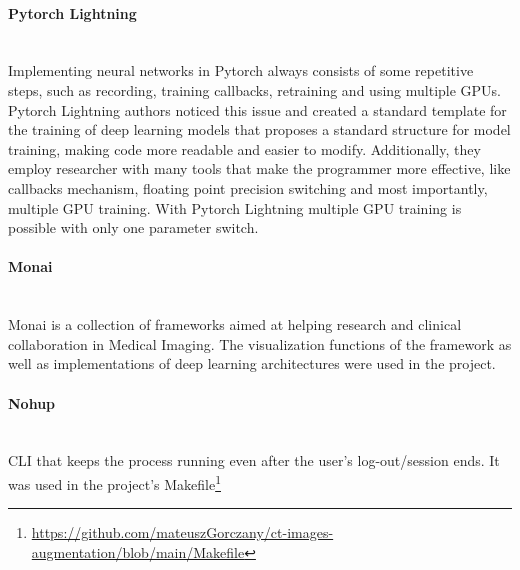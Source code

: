 \paragraph{Pytorch Lightning}\mbox{}\\
\indent Implementing neural networks in Pytorch always consists of some repetitive steps, such as recording, training callbacks, retraining and using multiple GPUs. Pytorch Lightning\cite{Falcon_PyTorch_Lightning_2019} authors noticed this issue and created a standard template for the training of deep learning models that proposes a standard structure for model training, making code more readable and easier to modify. Additionally, they employ researcher with many tools that make the programmer more effective, like callbacks mechanism, floating point precision switching and most importantly, multiple GPU training. With Pytorch Lightning multiple GPU training is possible with only one parameter switch. 

\paragraph{Monai}\mbox{}\\
\indent Monai\cite{Cardoso_MONAI_An_open-source_2022} is a collection of frameworks aimed at helping research and clinical collaboration in Medical Imaging. The visualization functions of the framework as well as implementations of deep learning architectures were used in the project.
\paragraph{Nohup}\mbox{}\\
\indent CLI that keeps the process running even after the user's log-out/session ends. It was used in the project's Makefile\footnote{\url{https://github.com/mateuszGorczany/ct-images-augmentation/blob/main/Makefile}} 